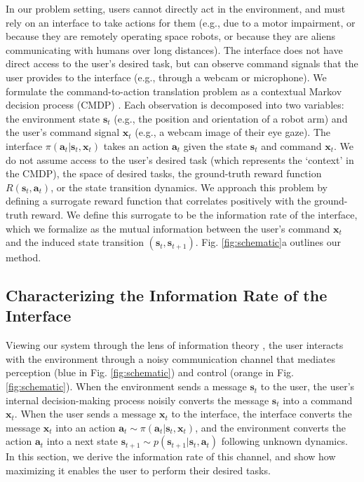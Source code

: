 \documentclass{article}
\newcommand{\bx}{\mathbf{x}}
\newcommand{\bs}{\mathbf{s}}
\newcommand{\ba}{\mathbf{a}}
\begin{document}
In our problem setting, users cannot directly act in the environment, and must rely on an interface to take actions for them (e.g., due to a motor impairment, or because they are remotely operating space robots, or because they are aliens communicating with humans over long distances).
The interface does not have direct access to the user's desired task, but can observe command signals that the user provides to the interface (e.g., through a webcam or microphone).
We formulate the command-to-action translation problem as a contextual Markov decision process (CMDP) \cite{hallak2015contextual}.
Each observation is decomposed into two variables: the environment state $\bs_t$ (e.g., the position and orientation of a robot arm) and the user's command signal $\bx_t$ (e.g., a webcam image of their eye gaze).
The interface $\pi(\ba_t | \bs_t, \bx_t)$ takes an action $\ba_t$ given the state $\bs_t$ and command $\bx_t$.
We do not assume access to the user's desired task (which represents the `context' in the CMDP), the space of desired tasks, the ground-truth reward function $R(\bs_t, \ba_t)$, or the state transition dynamics.
We approach this problem by defining a surrogate reward function that correlates positively with the ground-truth reward.
We define this surrogate to be the information rate of the interface, which we formalize as the mutual information between the user's command $\bx_t$ and the induced state transition $(\bs_t, \bs_{t+1})$.
Fig. \ref{fig:schematic}a outlines our method.

\subsection{Characterizing the Information Rate of the Interface} \label{info-rate}

Viewing our system through the lens of information theory \cite{shannon1948mathematical,mackay2003information}, the user interacts with the environment through a noisy communication channel that mediates perception (blue in Fig. \ref{fig:schematic}) and control (orange in Fig. \ref{fig:schematic}).
When the environment sends a message $\bs_t$ to the user, the user's internal decision-making process noisily converts the message $\bs_t$ into a command $\bx_t$.
When the user sends a message $\bx_t$ to the interface, the interface converts the message $\bx_t$ into an action $\ba_t \sim \pi(\ba_t | \bs_t, \bx_t)$, and the environment converts the action $\ba_t$ into a next state $\bs_{t+1} \sim p(\bs_{t+1} | \bs_t, \ba_t)$ following unknown dynamics.
In this section, we derive the information rate of this channel, and show how maximizing it enables the user to perform their desired tasks.
\end{document}
